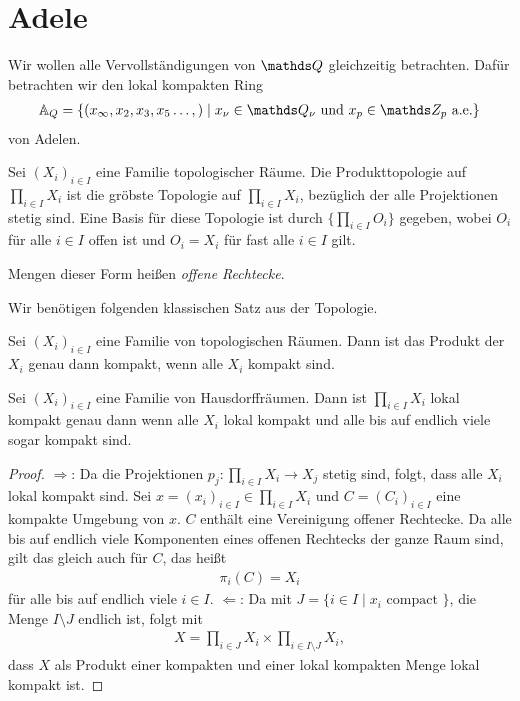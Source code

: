 \chapter{Adele}
Wir wollen alle Vervollständigungen von $\Q$ gleichzeitig betrachten.
Dafür betrachten wir den lokal kompakten Ring 
\begin{align*}
\A_Q=\{(x_\infty,x_2,x_3,x_5\dots,)\mid x_\nu \in \Q_\nu \text{ und } x_p \in \Z_p \text{ a.e.}\}
\end{align*}
von Adelen.

Sei $(X_i)_{i\in I}$ eine Familie topologischer Räume.
Die Produkttopologie auf $\prod_{i \in I} X_i$ ist die gröbste Topologie auf $\prod_{i \in I} X_i$, bezüglich der alle Projektionen stetig sind.
Eine Basis für diese Topologie ist durch $\{\prod_{i\in I}O_i\}$ gegeben, wobei $O_i$ für alle $i \in I$ offen ist und $O_i=X_i$ für fast alle $i \in I$ gilt.

Mengen dieser Form heißen \emph{offene Rechtecke}.

Wir benötigen folgenden klassischen Satz aus der Topologie.
\begin{thm}[Tychonoff]
Sei $(X_i)_{i \in I}$ eine Familie von topologischen Räumen. Dann ist das Produkt der $X_i$ genau dann kompakt, wenn alle $X_i$ kompakt sind.
\end{thm}

\begin{thm}
Sei $(X_i)_{i \in I}$ eine Familie von Hausdorffräumen. Dann ist $\prod_{i \in I} X_i$ lokal kompakt genau dann wenn alle $X_i$ lokal kompakt und alle bis auf endlich viele sogar kompakt sind.
\end{thm}

\begin{proof}
\glqq $\Rightarrow$\grqq : Da die Projektionen $p_j \colon \prod_{i \in I} X_i \to X_j$ stetig sind, folgt, dass alle $X_i$ lokal kompakt sind.
Sei $x=(x_i)_{i\in I} \in \prod_{i \in I} X_i$ und $C=(C_i)_{i \in I}$ eine kompakte Umgebung von $x$.
$C$ enthält eine Vereinigung offener Rechtecke. Da alle bis auf endlich viele Komponenten eines offenen Rechtecks der ganze Raum sind, gilt das gleich auch für $C$, das heißt
\begin{align*}
\pi_i(C)=X_i
\end{align*}
für alle bis auf endlich viele $i \in I$.
\glqq $\Leftarrow$\grqq : Da mit $J=\{i\in I \mid x_i \text{ compact }\}$, die Menge $I \setminus J$ endlich ist, folgt mit
\begin{align*}
X=\prod_{i \in J} X_i \times \prod_{i \in I\setminus J}X_i,
\end{align*}
dass $X$ als Produkt einer kompakten und einer lokal kompakten Menge lokal kompakt ist.
\end{proof}

